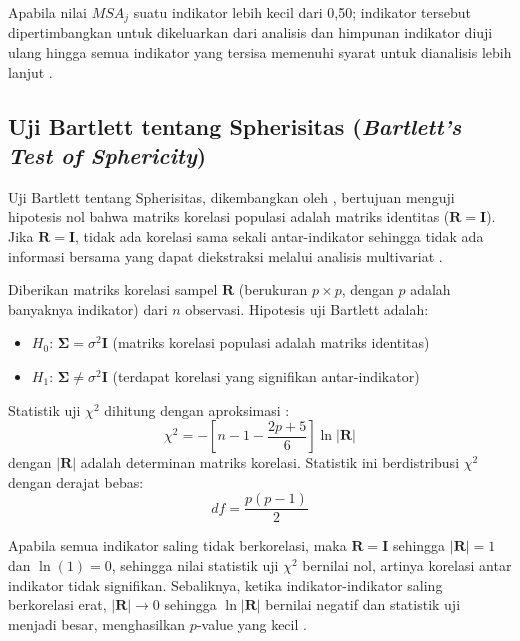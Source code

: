 Apabila nilai $MSA_j$ suatu indikator lebih kecil dari 0{,}50; indikator tersebut dipertimbangkan untuk dikeluarkan dari analisis dan himpunan indikator diuji ulang hingga semua indikator yang tersisa memenuhi syarat untuk dianalisis lebih lanjut \citep{hair2019, alfia2024}.

\subsection{\normalsize Uji Bartlett tentang Spherisitas (\textit{Bartlett's Test of Sphericity})}

Uji Bartlett tentang Spherisitas, dikembangkan oleh \citet{bartlett1954}, bertujuan menguji hipotesis nol bahwa matriks korelasi populasi adalah matriks identitas ($\mathbf{R} = \mathbf{I}$). Jika $\mathbf{R} = \mathbf{I}$, tidak ada korelasi sama sekali antar-indikator sehingga tidak ada informasi bersama yang dapat diekstraksi melalui analisis multivariat \citep{johnson2007}.

\begin{definition}
  Diberikan matriks korelasi sampel $\mathbf{R}$ (berukuran $p \times p$, dengan $p$ adalah banyaknya indikator) dari $n$ observasi. Hipotesis uji Bartlett adalah:
  \begin{itemize}
    \item $H_0$: $\boldsymbol{\Sigma} = \sigma^2 \mathbf{I}$ \quad (matriks korelasi populasi adalah matriks identitas)
    \item $H_1$: $\boldsymbol{\Sigma} \neq \sigma^2 \mathbf{I}$ \quad (terdapat korelasi yang signifikan antar-indikator)
  \end{itemize}
  Statistik uji $\chi^2$ dihitung dengan aproksimasi \citep{bartlett1954}:
  \begin{equation} \label{eq:bartlett}
    \chi^2 = -\left[ n - 1 - \frac{2p + 5}{6} \right] \ln |\mathbf{R}|
  \end{equation}
  dengan $|\mathbf{R}|$ adalah determinan matriks korelasi. Statistik ini berdistribusi $\chi^2$ dengan derajat bebas:
  \begin{equation}
    df = \frac{p(p-1)}{2}
  \end{equation}
\end{definition}

\begin{remark}
  Apabila semua indikator saling tidak berkorelasi, maka $\mathbf{R} = \mathbf{I}$ sehingga $|\mathbf{R}| = 1$ dan $\ln(1) = 0$, sehingga nilai statistik uji $\chi^2$ bernilai nol, artinya korelasi antar indikator tidak signifikan. Sebaliknya, ketika indikator-indikator saling berkorelasi erat, $|\mathbf{R}| \to 0$ sehingga $\ln|\mathbf{R}|$ bernilai negatif dan statistik uji menjadi besar, menghasilkan $p$-value yang kecil \citep{johnson2007}.
\end{remark}

